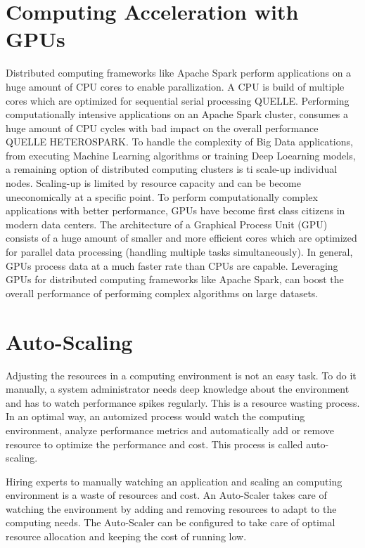 \section{Computing Acceleration with GPUs}
Distributed computing frameworks like Apache Spark perform applications on a huge amount of CPU cores to enable parallization. A CPU is build of multiple cores which are optimized for sequential serial processing QUELLE. Performing computationally intensive applications on an Apache Spark cluster, consumes a huge amount of CPU cycles with bad impact on the overall performance QUELLE HETEROSPARK.
To handle the complexity of Big Data applications, from executing Machine Learning algorithms or training Deep Loearning models, a remaining option of distributed computing clusters is ti scale-up individual nodes. Scaling-up is limited by resource capacity and can be become uneconomically at a specific point.
To perform computationally complex applications with better performance, GPUs have become first class citizens in modern data centers. The architecture of a Graphical Process Unit (GPU) consists of a huge amount of smaller and more efficient cores which are optimized for parallel data processing (handling multiple tasks simultaneously). In general, GPUs process data at a much faster rate than CPUs are capable.
Leveraging GPUs for distributed computing frameworks like Apache Spark, can boost the overall performance of performing complex algorithms on large datasets.


\section{Auto-Scaling}
Adjusting the resources in a computing environment is not an easy task. To do it manually, a system administrator needs deep knowledge about the environment and has to watch performance spikes regularly. This is a resource wasting process. In an optimal way, an automized process would watch the computing environment, analyze performance metrics and automatically add or remove resource to optimize the performance and cost. This process is called auto-scaling.


Hiring experts to manually watching an application and scaling an computing environment is a waste of resources and cost.
An Auto-Scaler takes care of watching the environment by adding and removing resources to adapt to the computing needs. The Auto-Scaler can be configured to take care of optimal resource allocation and keeping the cost of running low.


